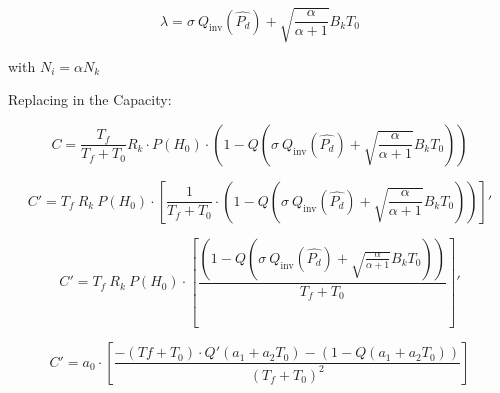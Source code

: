 \documentclass[a4paper,10pt]{article}
\begin{document}
 
  \begin{equation}
  \lambda        = 
   \sigma \  Q_\textrm{inv}   ( \hat{P_d}   )    + \sqrt{ \frac{   \alpha }{ \alpha   + 1}  } B_k T_0
\end{equation}


with $N_i = \alpha N_k$

Replacing  in the Capacity:

$$ C = \frac{T_f}{T_f + T_0}R_k  \cdot P(H_0) \cdot \left(1-   Q \left(   \sigma \  Q_\textrm{inv}   ( \hat{P_d}   )    + \sqrt{ \frac{   \alpha }{ \alpha   + 1}  } B_k T_0  \right)      \right) $$
 

\begin{equation}
 C' =    T_f \ R_k  \ P(H_0) \cdot 
 \left[ \frac{1}{T_f + T_0} \cdot 
 \left(1-   Q \left(   \sigma \  Q_\textrm{inv}   ( \hat{P_d}   )    + \sqrt{ \frac{   \alpha }{ \alpha   + 1}  } B_k T_0  \right)      \right)  
\right]'
 \end{equation}
  
  
  \begin{equation}
 C' =    T_f \ R_k  \ P(H_0) \cdot 
 \left[ \frac{ \left(1-   Q \left(   \sigma \  Q_\textrm{inv}   ( \hat{P_d}   )    
 + \sqrt{ \frac{   \alpha }{ \alpha   + 1}  } B_k T_0  \right)      \right)}{T_f + T_0}    
\right]'
 \end{equation}

 
   \begin{equation}
 C' =    a_0 \cdot 
 \left[ \frac{  -(Tf + T_0) \cdot 
  Q' \left(   a_1   
 + a_2 T_0  \right)     
 -\left(1-   Q \left(  a_1
 + a_2 T_0  \right)      \right)}
 { (T_f + T_0)^2 }    
\right]
 \end{equation}
 
 
 
 
 
 
 
 
 
\end{document}

